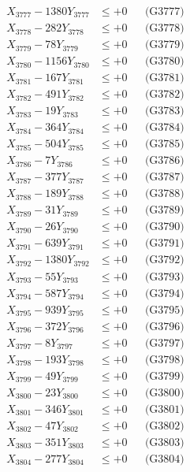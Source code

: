 \documentclass[a4paper,10pt]{article}
\begin{document}
{\begin{align}
X_{3777} - 1380Y_{3777} &\leq +0 && \text{(G3777)} \\
X_{3778} - 282Y_{3778} &\leq +0 && \text{(G3778)} \\
X_{3779} - 78Y_{3779} &\leq +0 && \text{(G3779)} \\
X_{3780} - 1156Y_{3780} &\leq +0 && \text{(G3780)} \\
\allowbreak
X_{3781} - 167Y_{3781} &\leq +0 && \text{(G3781)} \\
X_{3782} - 491Y_{3782} &\leq +0 && \text{(G3782)} \\
X_{3783} - 19Y_{3783} &\leq +0 && \text{(G3783)} \\
X_{3784} - 364Y_{3784} &\leq +0 && \text{(G3784)} \\
X_{3785} - 504Y_{3785} &\leq +0 && \text{(G3785)} \\
X_{3786} - 7Y_{3786} &\leq +0 && \text{(G3786)} \\
X_{3787} - 377Y_{3787} &\leq +0 && \text{(G3787)} \\
X_{3788} - 189Y_{3788} &\leq +0 && \text{(G3788)} \\
X_{3789} - 31Y_{3789} &\leq +0 && \text{(G3789)} \\
X_{3790} - 26Y_{3790} &\leq +0 && \text{(G3790)} \\
\allowbreak
X_{3791} - 639Y_{3791} &\leq +0 && \text{(G3791)} \\
X_{3792} - 1380Y_{3792} &\leq +0 && \text{(G3792)} \\
X_{3793} - 55Y_{3793} &\leq +0 && \text{(G3793)} \\
X_{3794} - 587Y_{3794} &\leq +0 && \text{(G3794)} \\
X_{3795} - 939Y_{3795} &\leq +0 && \text{(G3795)} \\
X_{3796} - 372Y_{3796} &\leq +0 && \text{(G3796)} \\
X_{3797} - 8Y_{3797} &\leq +0 && \text{(G3797)} \\
X_{3798} - 193Y_{3798} &\leq +0 && \text{(G3798)} \\
X_{3799} - 49Y_{3799} &\leq +0 && \text{(G3799)} \\
X_{3800} - 23Y_{3800} &\leq +0 && \text{(G3800)} \\
\allowbreak
X_{3801} - 346Y_{3801} &\leq +0 && \text{(G3801)} \\
X_{3802} - 47Y_{3802} &\leq +0 && \text{(G3802)} \\
X_{3803} - 351Y_{3803} &\leq +0 && \text{(G3803)} \\
X_{3804} - 277Y_{3804} &\leq +0 && \text{(G3804)} \\

\end{align}}
\end{document}
